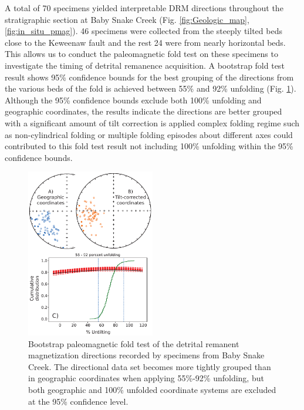 \documentclass[draft]{agujournal2019}
\begin{document}
A total of 70 specimens yielded interpretable DRM directions throughout the stratigraphic section at Baby Snake Creek (Fig. \ref{fig:Geologic_map}, \ref{fig:in_situ_pmag}). 46 specimens were collected from the steeply tilted beds close to the Keweenaw fault and the rest 24 were from nearly horizontal beds. This allows us to conduct the paleomagnetic fold test on these specimens to investigate the timing of detrital remanence acquisition. A bootstrap fold test \cite{Tauxe1994a} result shows 95\% confidence bounds for the best grouping of the directions from the various beds of the fold is achieved between 55\% and 92\% unfolding (Fig. \ref{fig:fold_test}). Although the 95\% confidence bounds exclude both 100\% unfolding and geographic coordinates, the results indicate the directions are better grouped with a significant amount of tilt correction is applied complex folding regime such as non-cylindrical folding or multiple folding episodes about different axes could contributed to this fold test result not including 100\% unfolding within the 95\% confidence bounds.  

\begin{figure}
\centering
\includegraphics[width=0.5\textwidth]{SC1_fold_test.pdf}
\caption{Bootstrap paleomagnetic fold test \cite{Tauxe1994a} of the detrital remanent magnetization directions recorded by specimens from Baby Snake Creek. The directional data set becomes more tightly grouped than in geographic coordinates when applying 55\%-92\% unfolding, but both geographic and 100\% unfolded coordinate systems are excluded at the 95\% confidence level. }
\label{fig:fold_test}
\end{figure}
\end{document}
